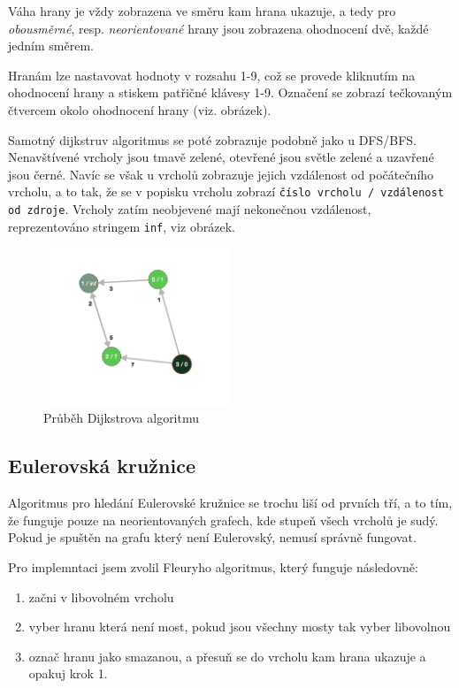 \documentclass{article}
\def\code#1{\texttt{#1}}
\begin{document}
Váha hrany je vždy zobrazena ve směru kam hrana ukazuje, a tedy pro
\emph{obousměrné}, resp. \emph{neorientované} hrany jsou zobrazena ohodnocení dvě,
každé jedním směrem.

Hranám lze nastavovat hodnoty v rozsahu 1-9, což se provede kliknutím na
ohodnocení hrany a stiskem patřičné klávesy 1-9. Označení se zobrazí
tečkovaným čtvercem okolo ohodnocení hrany (viz. obrázek).

Samotný dijkstruv algoritmus se poté zobrazuje podobně jako u DFS/BFS.
Nenavštívené vrcholy jsou tmavě zelené, otevřené jsou světle zelené a
uzavřené jsou černé. Navíc se však u vrcholů zobrazuje jejich vzdálenost
od počátečního vrcholu, a to tak, že se v popisku vrcholu zobrazí \code{číslo
vrcholu / vzdálenost od zdroje}. Vrcholy zatím neobjevené mají
nekonečnou vzdálenost, reprezentováno stringem \code{inf}, viz obrázek.

\begin{figure}
  \centering
    \includegraphics[width=0.5\textwidth]{OWYHOQ7.png}
  \caption{Průběh Dijkstrova algoritmu}
\end{figure}

\subsection{Eulerovská kružnice}

Algoritmus pro hledání Eulerovské kružnice se trochu liší od prvních
tří, a to tím, že funguje pouze na neorientovaných grafech, kde stupeň
všech vrcholů je sudý. Pokud je spuštěn na grafu který není Eulerovský,
nemusí správně fungovat.

Pro implemntaci jsem zvolil Fleuryho algoritmus, který funguje následovně:

\begin{enumerate}
  \item začni v libovolném vrcholu
  \item vyber hranu která není most, pokud jsou všechny mosty tak vyber libovolnou
  \item označ hranu jako smazanou, a přesuň se do vrcholu kam hrana ukazuje a opakuj krok 1.
\end{enumerate}
\end{document}
